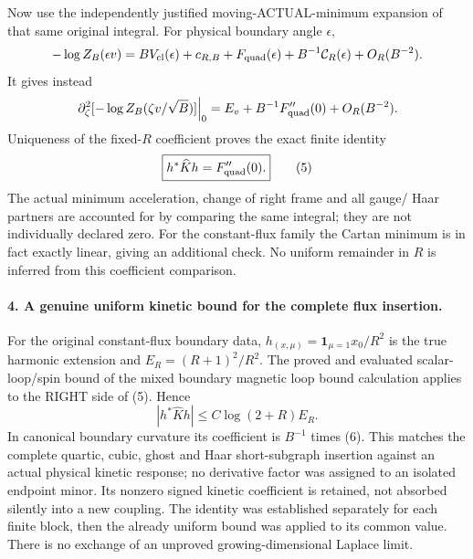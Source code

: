 \documentclass[11pt]{article}
\begin{document}
Now use the independently justified moving-ACTUAL-minimum expansion of
that same original integral. For physical boundary angle $\epsilon$,
\[
 -\log Z_B(\epsilon v)=B V_{\rm cl}(\epsilon)
   +c_{R,B}+F_{\rm quad}(\epsilon)
   +B^{-1}\mathcal C_R(\epsilon)+O_R(B^{-2}).
\]
It gives instead
\[
 \left.\partial_\zeta^2[-\log Z_B(\zeta v/\sqrt B)]\right|_0
       =E_v+B^{-1}F_{\rm quad}''(0)+O_R(B^{-2}).
\]
Uniqueness of the fixed-$R$ coefficient proves the exact finite identity
\[
 \boxed{h^*\widehat K h=F_{\rm quad}''(0).}                        \tag{5}
\]
The actual minimum acceleration, change of right frame and all gauge/
Haar partners are accounted for by comparing the same integral; they
are not individually declared zero. For the constant-flux family the
Cartan minimum is in fact exactly linear, giving an additional check.
No uniform remainder in $R$ is inferred from this coefficient comparison.

\paragraph{4. A genuine uniform kinetic bound for the complete flux insertion.}
For the original constant-flux boundary data,
$h_{(x,\mu)}=\mathbf1_{\mu=1}x_0/R^2$ is the true harmonic extension and
$E_R=(R+1)^2/R^2$. The proved and evaluated scalar-loop/spin
bound of the mixed boundary magnetic loop bound calculation applies to the RIGHT side of (5). Hence
\[
 \boxed{|h^*\widehat K h|\le C\log(2+R)E_R.}                     \tag{6}
\]
In canonical boundary curvature its coefficient is $B^{-1}$ times (6).
This matches the complete quartic, cubic, ghost and Haar short-subgraph
insertion against an actual physical kinetic response; no derivative
factor was assigned to an isolated endpoint minor. Its nonzero signed
kinetic coefficient is retained, not absorbed silently into a new coupling.
The identity was established separately for each finite block, then the
already uniform bound was applied to its common value. There is no exchange
of an unproved growing-dimensional Laplace limit.
\end{document}
